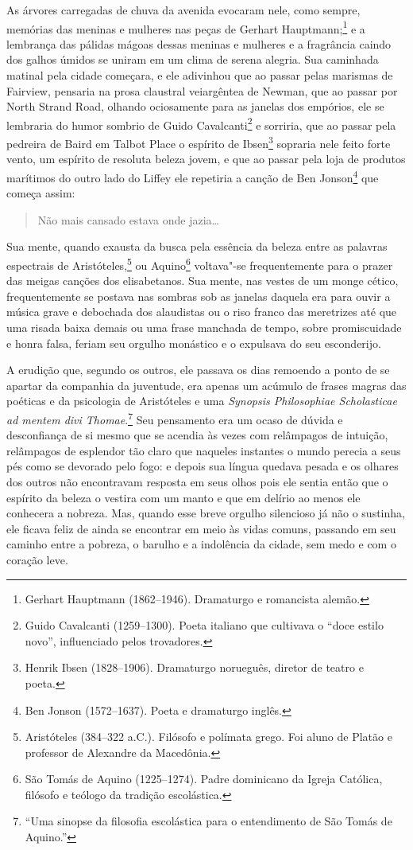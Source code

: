 As árvores carregadas de chuva da avenida evocaram nele, como sempre, memórias
das meninas e mulheres nas peças de Gerhart Hauptmann;\footnote{ Gerhart
Hauptmann (1862--1946). Dramaturgo e romancista alemão.} e a lembrança das
pálidas mágoas dessas meninas e mulheres e a fragrância caindo dos galhos úmidos
se uniram em um clima de serena alegria. Sua caminhada matinal pela cidade
começara, e ele adivinhou que ao passar pelas marismas de Fairview, 
pensaria na prosa claustral veiargêntea de Newman, que ao passar por North
Strand Road, olhando ociosamente para as janelas dos empórios, ele se lembraria
do humor sombrio de Guido Cavalcanti\footnote{ Guido Cavalcanti (1259--1300).
Poeta italiano que cultivava o “doce estilo novo”, influenciado pelos
trovadores.} e sorriria, que ao passar pela pedreira de Baird em Talbot Place o
espírito de Ibsen\footnote{ Henrik Ibsen (1828--1906). Dramaturgo norueguês,
diretor de teatro e poeta.} sopraria nele feito forte vento, um espírito de
resoluta beleza jovem, e que ao passar pela loja de produtos marítimos do outro
lado do Liffey ele repetiria a canção de Ben Jonson\footnote{ Ben Jonson
(1572--1637). Poeta e dramaturgo inglês.} que começa assim:                                         

\begin{quote}
Não mais cansado estava onde jazia\ldots{}
\end{quote}

Sua mente, quando exausta da busca pela essência da beleza entre as palavras
espectrais de Aristóteles,\footnote{ Aristóteles (384--322 a.C.). Filósofo e
polímata grego. Foi aluno de Platão e professor de Alexandre da Macedônia.} ou
Aquino\footnote{ São Tomás de Aquino (1225--1274). Padre dominicano da Igreja
Católica, filósofo e teólogo da tradição escolástica.} voltava"-se
frequentemente para o prazer das meigas canções dos elisabetanos. Sua mente, nas
vestes de um monge cético, frequentemente se postava nas sombras sob as janelas
daquela era para ouvir a música grave e debochada dos alaudistas ou o riso
franco das meretrizes até que uma risada baixa demais ou uma frase manchada de
tempo, sobre promiscuidade e honra falsa, feriam seu orgulho monástico e o
expulsava do seu esconderijo.

A erudição que, segundo os outros, ele passava os dias remoendo a ponto de se
apartar da companhia da juventude, era apenas um acúmulo de frases magras das
poéticas e da psicologia de Aristóteles e uma \textit{Synopsis Philosophiae
Scholasticae ad mentem divi Thomae}.\footnote{ “Uma sinopse da filosofia
escolástica para o entendimento de São Tomás de Aquino.”} Seu
pensamento era um ocaso de dúvida e desconfiança de si mesmo que se acendia às
vezes com relâmpagos de intuição, relâmpagos de esplendor tão claro que naqueles
instantes o mundo perecia a seus pés como se devorado pelo fogo: e depois sua
língua quedava pesada e os olhares dos outros não encontravam resposta em seus
olhos pois ele sentia então que o espírito da beleza o vestira com um manto e
que em delírio ao menos ele conhecera a nobreza. Mas, quando esse breve orgulho
silencioso já não o sustinha, ele ficava feliz de ainda se encontrar em meio às
vidas comuns, passando em seu caminho entre a pobreza, o barulho e a indolência
da cidade, sem medo e com o coração leve.

